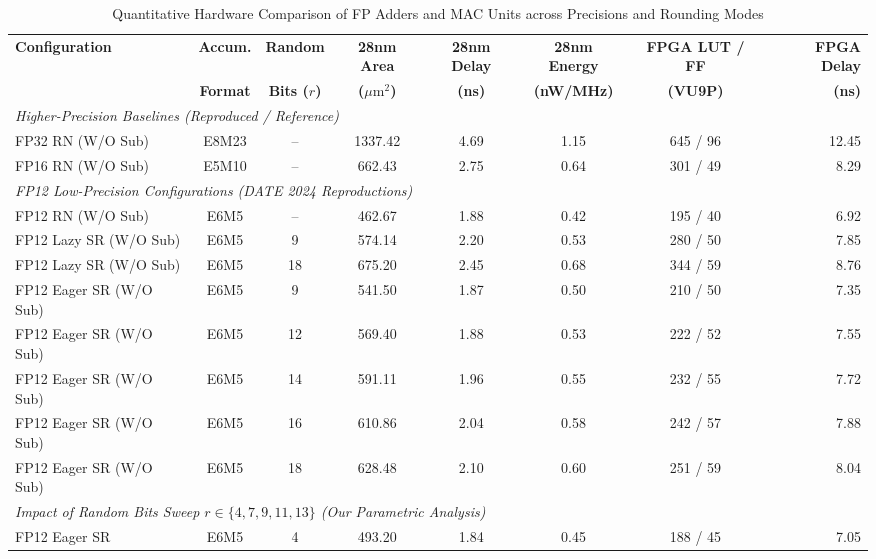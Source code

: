 \begin{table}[t]
\centering
\caption{Quantitative Hardware Comparison of FP Adders and MAC Units across Precisions and Rounding Modes}
\label{tab:hardware_comparison}
\small
\begin{tabular}{lccccccr}
\toprule
\textbf{Configuration} & \textbf{Accum.} & \textbf{Random} & \textbf{28nm Area} & \textbf{28nm Delay} & \textbf{28nm Energy} & \textbf{FPGA LUT / FF} & \textbf{FPGA Delay} \\
 & \textbf{Format} & \textbf{Bits ($r$)} & \textbf{($\mu\text{m}^2$)} & \textbf{(ns)} & \textbf{(nW/MHz)} & \textbf{(VU9P)} & \textbf{(ns)} \\
\midrule
\multicolumn{8}{l}{\textit{Higher-Precision Baselines (Reproduced / Reference)}} \\
FP32 RN (W/O Sub) & E8M23 & -- & 1337.42 & 4.69 & 1.15 & 645 / 96 & 12.45 \\
FP16 RN (W/O Sub) & E5M10 & -- & 662.43 & 2.75 & 0.64 & 301 / 49 & 8.29 \\
\midrule
\multicolumn{8}{l}{\textit{FP12 Low-Precision Configurations (DATE 2024 Reproductions)}} \\
FP12 RN (W/O Sub) & E6M5 & -- & 462.67 & 1.88 & 0.42 & 195 / 40 & 6.92 \\
FP12 Lazy SR (W/O Sub) & E6M5 & 9 & 574.14 & 2.20 & 0.53 & 280 / 50 & 7.85 \\
FP12 Lazy SR (W/O Sub) & E6M5 & 18 & 675.20 & 2.45 & 0.68 & 344 / 59 & 8.76 \\
FP12 Eager SR (W/O Sub) & E6M5 & 9 & 541.50 & 1.87 & 0.50 & 210 / 50 & 7.35 \\
FP12 Eager SR (W/O Sub) & E6M5 & 12 & 569.40 & 1.88 & 0.53 & 222 / 52 & 7.55 \\
FP12 Eager SR (W/O Sub) & E6M5 & 14 & 591.11 & 1.96 & 0.55 & 232 / 55 & 7.72 \\
FP12 Eager SR (W/O Sub) & E6M5 & 16 & 610.86 & 2.04 & 0.58 & 242 / 57 & 7.88 \\
FP12 Eager SR (W/O Sub) & E6M5 & 18 & 628.48 & 2.10 & 0.60 & 251 / 59 & 8.04 \\
\midrule
\multicolumn{8}{l}{\textit{Impact of Random Bits Sweep $r \in \{4, 7, 9, 11, 13\}$ (Our Parametric Analysis)}} \\
FP12 Eager SR & E6M5 & 4 & 493.20 & 1.84 & 0.45 & 188 / 45 & 7.05 \\

\end{tabular}
\end{table}
